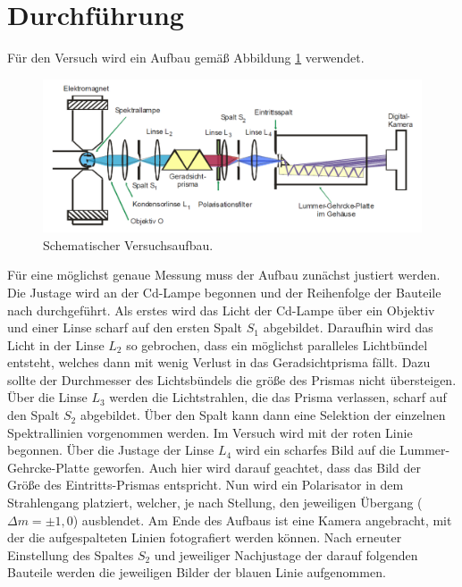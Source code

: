 \section{Durchführung}
\label{sec:Durchführung}


Für den Versuch wird ein Aufbau gemäß Abbildung \ref{fig:aufbau} verwendet.

\begin{figure}
    \centering
    \includegraphics[width=\textwidth]{Bilder/Aufbau.PNG}
    \caption{Schematischer Versuchsaufbau.}
    \label{fig:aufbau}
\end{figure}

Für eine möglichst genaue Messung muss der Aufbau zunächst justiert werden. Die Justage wird an der Cd-Lampe begonnen und der Reihenfolge der Bauteile nach durchgeführt. 
Als erstes wird das Licht der Cd-Lampe über ein Objektiv und einer Linse scharf auf den ersten Spalt $S_1$ abgebildet.
Daraufhin wird das Licht in der Linse $L_2$ so gebrochen, dass ein möglichst paralleles Lichtbündel entsteht, welches dann mit wenig Verlust in das Geradsichtprisma fällt. Dazu sollte der Durchmesser des Lichtsbündels die größe des Prismas nicht übersteigen. 
Über die Linse $L_3$ werden die Lichtstrahlen, die das Prisma verlassen, scharf auf den Spalt $S_2$ abgebildet. Über den Spalt kann dann eine Selektion der einzelnen Spektrallinien vorgenommen werden. Im Versuch wird mit der roten Linie begonnen. Über die Justage der Linse $L_4$ wird ein scharfes Bild auf die Lummer-Gehrcke-Platte geworfen. Auch hier wird darauf geachtet, dass das Bild der Größe des Eintritts-Prismas entspricht. 
Nun wird ein Polarisator in dem Strahlengang platziert, welcher, je nach Stellung, den jeweiligen Übergang ($\Delta m = \pm1,0$) ausblendet.
Am Ende des Aufbaus ist eine Kamera angebracht, mit der die aufgespalteten Linien fotografiert werden können. Nach erneuter Einstellung des Spaltes $S_2$ und jeweiliger Nachjustage der darauf folgenden Bauteile werden die jeweiligen Bilder der blauen Linie aufgenommen.


